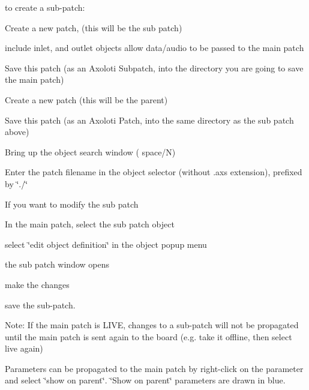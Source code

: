 to create a sub-\/patch\+:


\begin{DoxyItemize}
\item Create a new patch, (this will be the sub patch) 
\item include inlet, and outlet objects allow data/audio to be passed to the main patch 
\item Save this patch (as an Axoloti Subpatch, into the directory you are going to save the main patch)  
\item Create a new patch (this will be the parent) 
\item Save this patch (as an Axoloti Patch, into the same directory as the sub patch above) 
\item Bring up the object search window ( space/N) 
\item Enter the patch filename in the object selector (without .axs extension), prefixed by \char`\"{}./\char`\"{} 
\end{DoxyItemize}

If you want to modify the sub patch


\begin{DoxyItemize}
\item In the main patch, select the sub patch object 
\item select \char`\"{}edit object definition\char`\"{} in the object popup menu 
\item the sub patch window opens 
\item make the changes 
\item save the sub-\/patch. 
\end{DoxyItemize}

Note\+: If the main patch is L\+I\+VE, changes to a sub-\/patch will not be propagated until the main patch is sent again to the board (e.\+g. take it offline, then select live again)

Parameters can be propagated to the main patch by right-\/click on the parameter and select \char`\"{}show on parent\char`\"{}. \char`\"{}\+Show on parent\char`\"{} parameters are drawn in blue.

